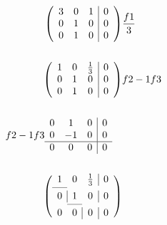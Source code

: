 \[
    \begin{aligned}
        \left(
            \begin{array}{ccc|c}
                3 & 0 & 1 & 0 \\
                0 & 1 & 0 & 0 \\
                0 & 1 & 0 & 0 \\
            \end{array}
        \right)
        &\frac{f1}{3} \\ \\
        \left(
            \begin{array}{ccc|c}
                1 & 0 & \frac{1}{3} & 0 \\
                0 & 1 & 0 & 0 \\
                0 & 1 & 0 & 0 \\
            \end{array}
        \right)
        &f2-1f3 \\ \\
        \begin{aligned}
            f2-1f3
            &\begin{array}{ccc|c}
                0 & 1 & 0 & 0 \\
                0 & -1 & 0 & 0  \\
                \hline
                0 & 0 & 0 & 0 \\ 
            \end{array}
        \end{aligned} \\ \\
        \left(
            \begin{array}{ccc|c}
                1 & 0 & \frac{1}{3} & 0 \\
                \cmidrule{1-1} \multicolumn{1}{c|}{0} & 1 & 0 & 0 \\
                \cmidrule{2-2} 0 & \multicolumn{1}{c|}{0} & 0 & 0 \\
            \end{array}
        \right)
    \end{aligned}
\]

